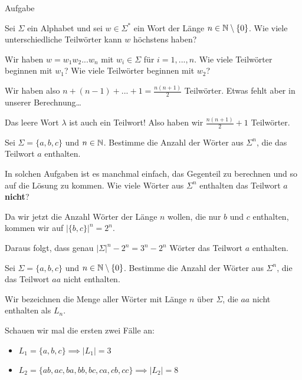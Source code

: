     \begin{subbox}{Aufgabe}

	Sei $\Sigma$ ein Alphabet und sei $w \in \Sigma^*$ ein Wort der Länge $n \in \mathbb{N} \setminus \{0\}$. Wie viele unterschiedliche Teilwörter kann $w$ höchstens haben?
	\end{subbox}


	Wir haben $w = w_1w_2...w_n$ mit $w_i \in \Sigma$ für $i = 1, ...,n$. Wie viele Teilwörter beginnen mit $w_1$? Wie viele Teilwörter beginnen mit $w_2$?
	 
	
	Wir haben also $n + (n-1) + ... + 1 = \frac{n(n+1)}{2}$ Teilwörter. Etwas fehlt aber in unserer Berechnung\dots
	
	
	Das leere Wort $\lambda$ ist auch ein Teilwort! Also haben wir $\frac{n(n+1)}{2}+ 1$ Teilwörter. 

    \vspace*{1cm}

	Sei $\Sigma = \{a, b, c\}$ und $n \in \mathbb{N}$. Bestimme die Anzahl der Wörter aus $\Sigma^n$, die das Teilwort $a$ enthalten.
	
    
	In solchen Aufgaben ist es manchmal einfach, das Gegenteil zu berechnen und so auf die Lösung zu kommen. Wie viele Wörter aus $\Sigma^n$ enthalten das Teilwort $a$ \textbf{nicht}?

	
	Da wir jetzt die Anzahl Wörter der Länge $n$ wollen, die nur $b$ und $c$ enthalten, kommen wir auf $|\{b,c\}|^n = 2^n$.
	
	Daraus folgt, dass genau $|\Sigma|^n - 2^n = 3^n -2^n$ Wörter das Teilwort $a$ enthalten.
    \vspace*{1cm}


	Sei $\Sigma= \{a,b,c\}$ und $n \in \mathbb{N} \setminus\{0\}$. Bestimme die Anzahl der Wörter aus $\Sigma^n$, die das Teilwort $aa$ nicht enthalten.


	Wir bezeichnen die Menge aller Wörter mit Länge $n$ über $\Sigma$, die $aa$ nicht enthalten als $L_n$.

	Schauen wir mal die ersten zwei Fälle an:
	\begin{itemize}
		\item $L_1 = \{a,b,c\} \implies |L_1| = 3$
		\item $L_2 = \{ab, ac, ba, bb, bc, ca, cb, cc\} \implies |L_2| = 8$ 
	\end{itemize}
	
